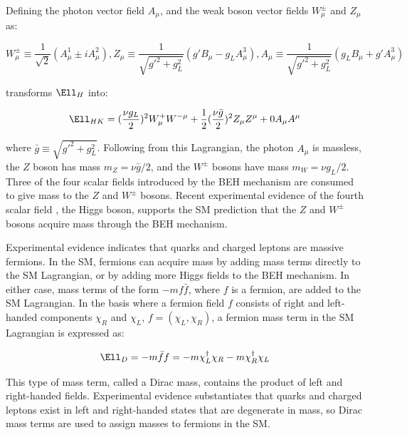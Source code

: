 Defining the photon vector field $A_{\mu}$, and the weak boson vector fields $W^{\pm}_{\mu}$ and $Z_{\mu}$ as:

\begin{equation}
	W^{\pm}_{\mu} \equiv \frac{1}{\sqrt{2}}(A^{1}_{\mu} \pm iA^{2}_{\mu}), 
	Z_{\mu} \equiv \frac{1}{\sqrt{g'^{2} + g^{2}_{L}}}(g'B_{\mu} - g_{L}A^{3}_{\mu}), 
	A_{\mu} \equiv \frac{1}{\sqrt{g'^{2} + g^{2}_{L}}}(g_{L}B_{\mu} + g'A^{3}_{\mu})
\end{equation}

transforms $\Ell_{H}$ into:

\begin{equation}
	\Ell_{HK} = (\frac{\nu g_{L}}{2})^{2}W^{+}_{\mu}W^{-\mu} + \frac{1}{2}(\frac{\nu \bar{g}}{2})^{2}Z_{\mu}Z^{\mu} + 0A_{\mu}A^{\mu}
\end{equation}

where $\bar{g} \equiv \sqrt{g'^{2} + g^{2}_{L}}$.  Following from this Lagrangian, the photon $A_{\mu}$ is massless, 
the $Z$ boson has mass $m_{Z} = \nu\bar{g}/2$, and the $W^{\pm}$ bosons have mass $m_{W} = \nu g_{L}/2$.  
Three of the four scalar fields introduced by the BEH mechanism are consumed to give mass to the $Z$ 
and $W^{\pm}$ bosons.  Recent experimental evidence of the fourth scalar field \cite{combinedHiggsResult}, the Higgs boson, 
supports the SM prediction that the $Z$ and $W^{\pm}$ bosons acquire mass through the BEH mechanism.

Experimental evidence indicates that quarks and charged leptons are massive fermions.  In the SM, fermions 
can acquire mass by adding mass terms directly to the SM Lagrangian, or by adding more Higgs fields to the 
BEH mechanism.  In either case, mass terms of the form $-mf\bar{f}$, where $f$ is a fermion, are added to 
the SM Lagrangian.  In the basis where a fermion field $f$ consists of right and left-handed components $\chi_{R}$ 
and $\chi_{L}$, $f = (\chi_{L},\chi_{R})$, a fermion mass term in the SM Lagrangian is expressed as:

\begin{equation}
	\Ell_{D} = -m\bar{f}f = -m\chi^{\dagger}_{L}\chi_{R} - m\chi^{\dagger}_{R}\chi_{L}
\end{equation}

This type of mass term, called a Dirac mass, contains the product of left and right-handed fields.  Experimental 
evidence substantiates that quarks and charged leptons exist in left and right-handed states that are degenerate 
in mass, so Dirac mass terms are used to assign masses to fermions in the SM.

